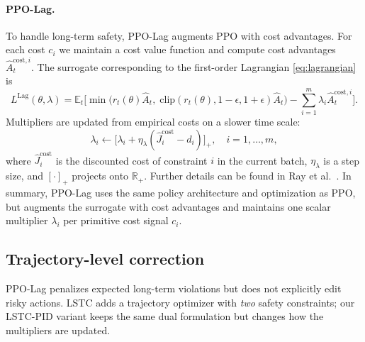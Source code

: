 \documentclass[11pt]{article}
\begin{document}
\paragraph{PPO-Lag.}
To handle long-term safety, PPO-Lag augments PPO with cost advantages.
For each cost $c_i$ we maintain a cost value function and compute cost advantages $\hat{A}_t^{\text{cost},i}$.
The surrogate corresponding to the first-order Lagrangian \eqref{eq:lagrangian} is
\begin{equation}
    L^{\text{Lag}}(\theta,\lambda)
    = \mathbb{E}_t\Big[
        \min\big(
            r_t(\theta)\hat{A}_t,\;
            \mathrm{clip}(r_t(\theta),1-\epsilon,1+\epsilon)\hat{A}_t
        \big)
        - \sum_{i=1}^m \lambda_i \hat{A}_t^{\text{cost},i}
    \Big].
\end{equation}
Multipliers are updated from empirical costs on a slower time scale:
\begin{equation}
    \lambda_i \leftarrow
    \Big[\lambda_i + \eta_\lambda (\hat{J}_i^{\text{cost}} - d_i)\Big]_+,
    \quad i=1,\dots,m,
    \label{eq:lambda-plain}
\end{equation}
where $\hat{J}_i^{\text{cost}}$ is the discounted cost of constraint $i$ in the current batch, $\eta_\lambda$ is a step size, and $[\cdot]_+$ projects onto $\mathbb{R}_+$.
Further details can be found in Ray et al.~\cite{ray2019safexp}.
In summary, PPO-Lag uses the same policy architecture and optimization as PPO, but augments the surrogate with cost advantages and maintains one scalar multiplier $\lambda_i$ per primitive cost signal $c_i$.

\subsection*{Trajectory-level correction}

PPO-Lag penalizes expected long-term violations but does not explicitly edit risky actions.
LSTC adds a trajectory optimizer with \emph{two} safety constraints; our LSTC-PID variant keeps the same dual formulation but changes how the multipliers are updated.
\end{document}
